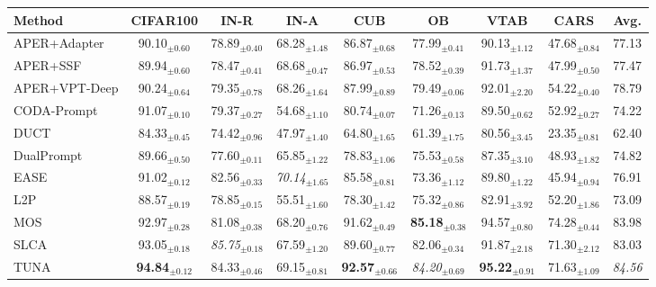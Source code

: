\renewcommand{\arraystretch}{0.95}
\begin{adjustbox}{max width=\textwidth}
\footnotesize
\begin{tabular}{l c c c c c c c c}
\toprule
Method & \textbf{CIFAR100} & \textbf{IN-R} & \textbf{IN-A} & \textbf{CUB} & \textbf{OB} & \textbf{VTAB} & \textbf{CARS} & \textbf{Avg.} \\
\midrule
APER+Adapter & 90.10$_{\pm 0.60}$ & 78.89$_{\pm 0.40}$ & 68.28$_{\pm 1.48}$ & 86.87$_{\pm 0.68}$ & 77.99$_{\pm 0.41}$ & 90.13$_{\pm 1.12}$ & 47.68$_{\pm 0.84}$ & 77.13 \\
APER+SSF & 89.94$_{\pm 0.60}$ & 78.47$_{\pm 0.41}$ & 68.68$_{\pm 0.47}$ & 86.97$_{\pm 0.53}$ & 78.52$_{\pm 0.39}$ & 91.73$_{\pm 1.37}$ & 47.99$_{\pm 0.50}$ & 77.47 \\
APER+VPT-Deep & 90.24$_{\pm 0.64}$ & 79.35$_{\pm 0.78}$ & 68.26$_{\pm 1.64}$ & 87.99$_{\pm 0.89}$ & 79.49$_{\pm 0.06}$ & 92.01$_{\pm 2.20}$ & 54.22$_{\pm 0.40}$ & 78.79 \\
CODA-Prompt & 91.07$_{\pm 0.10}$ & 79.37$_{\pm 0.27}$ & 54.68$_{\pm 1.10}$ & 80.74$_{\pm 0.07}$ & 71.26$_{\pm 0.13}$ & 89.50$_{\pm 0.62}$ & 52.92$_{\pm 0.27}$ & 74.22 \\
DUCT & 84.33$_{\pm 0.45}$ & 74.42$_{\pm 0.96}$ & 47.97$_{\pm 1.40}$ & 64.80$_{\pm 1.65}$ & 61.39$_{\pm 1.75}$ & 80.56$_{\pm 3.45}$ & 23.35$_{\pm 0.81}$ & 62.40 \\
DualPrompt & 89.66$_{\pm 0.50}$ & 77.60$_{\pm 0.11}$ & 65.85$_{\pm 1.22}$ & 78.83$_{\pm 1.06}$ & 75.53$_{\pm 0.58}$ & 87.35$_{\pm 3.10}$ & 48.93$_{\pm 1.82}$ & 74.82 \\
EASE & 91.02$_{\pm 0.12}$ & 82.56$_{\pm 0.33}$ & \textit{70.14}$_{\pm 1.65}$ & 85.58$_{\pm 0.81}$ & 73.36$_{\pm 1.12}$ & 89.80$_{\pm 1.22}$ & 45.94$_{\pm 0.94}$ & 76.91 \\
L2P & 88.57$_{\pm 0.19}$ & 78.85$_{\pm 0.15}$ & 55.51$_{\pm 1.60}$ & 78.30$_{\pm 1.42}$ & 75.32$_{\pm 0.86}$ & 82.91$_{\pm 3.92}$ & 52.20$_{\pm 1.86}$ & 73.09 \\
MOS & 92.97$_{\pm 0.28}$ & 81.08$_{\pm 0.38}$ & 68.20$_{\pm 0.76}$ & 91.62$_{\pm 0.49}$ & \textbf{85.18}$_{\pm 0.38}$ & 94.57$_{\pm 0.80}$ & 74.28$_{\pm 0.44}$ & 83.98 \\
SLCA & 93.05$_{\pm 0.18}$ & \textit{85.75}$_{\pm 0.18}$ & 67.59$_{\pm 1.20}$ & 89.60$_{\pm 0.77}$ & 82.06$_{\pm 0.34}$ & 91.87$_{\pm 2.18}$ & 71.30$_{\pm 2.12}$ & 83.03 \\
TUNA & \textbf{94.84}$_{\pm 0.12}$ & 84.33$_{\pm 0.46}$ & 69.15$_{\pm 0.81}$ & \textbf{92.57}$_{\pm 0.66}$ & \textit{84.20}$_{\pm 0.69}$ & \textbf{95.22}$_{\pm 0.91}$ & 71.63$_{\pm 1.09}$ & \textit{84.56} \\

\end{tabular}
\end{adjustbox}
